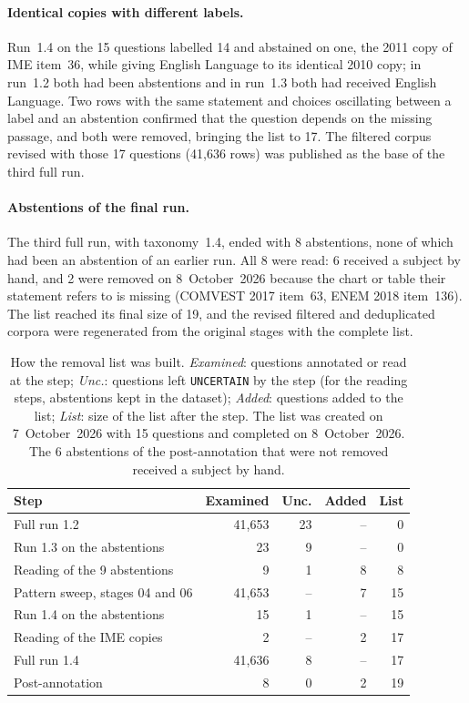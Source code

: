 \paragraph{Identical copies with different labels.} Run~1.4 on the 15
questions labelled 14 and abstained on one, the 2011 copy of IME item~36,
while giving English Language to its identical 2010 copy; in run~1.2 both had
been abstentions and in run~1.3 both had received English Language. Two rows
with the same statement and choices oscillating between a label and an
abstention confirmed that the question depends on the missing passage, and
both were removed, bringing the list to 17. The filtered corpus revised with
those 17 questions (41,636 rows) was published as the base of the third full
run.

\paragraph{Abstentions of the final run.} The third full run, with
taxonomy~1.4, ended with 8 abstentions, none of which had been an abstention
of an earlier run. All 8 were read: 6 received a subject by hand, and 2 were
removed on 8~October~2026 because the chart or table their statement refers to
is missing (COMVEST 2017 item~63, ENEM 2018 item~136). The list reached its
final size of 19, and the revised filtered and deduplicated corpora were
regenerated from the original stages with the complete list.

\begin{table}[t]
\centering
\footnotesize
\setlength{\tabcolsep}{4pt}
\begin{tabular}{@{}lrrrr@{}}
\toprule
Step & Examined & Unc. & Added & List \\
\midrule
Full run 1.2 & 41,653 & 23 & -- & 0 \\
Run 1.3 on the abstentions & 23 & 9 & -- & 0 \\
Reading of the 9 abstentions & 9 & 1 & 8 & 8 \\
Pattern sweep, stages 04 and 06 & 41,653 & -- & 7 & 15 \\
Run 1.4 on the abstentions & 15 & 1 & -- & 15 \\
Reading of the IME copies & 2 & -- & 2 & 17 \\
Full run 1.4 & 41,636 & 8 & -- & 17 \\
Post-annotation & 8 & 0 & 2 & 19 \\
\bottomrule
\end{tabular}
\caption{How the removal list was built. \emph{Examined}: questions annotated or read at the step; \emph{Unc.}: questions left \texttt{UNCERTAIN} by the step (for the reading steps, abstentions kept in the dataset); \emph{Added}: questions added to the list; \emph{List}: size of the list after the step. The list was created on 7~October~2026 with 15 questions and completed on 8~October~2026. The 6 abstentions of the post-annotation that were not removed received a subject by hand.}
\label{tab:rev-funnel}
\end{table}

